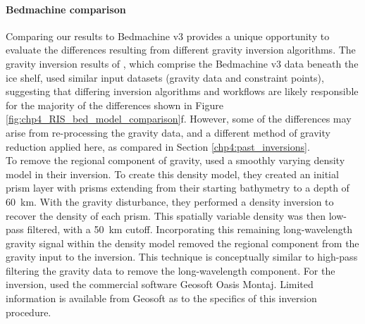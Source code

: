 \paragraph*{Bedmachine comparison}

Comparing our results to Bedmachine v3 provides a unique opportunity to evaluate the differences resulting from different gravity inversion algorithms. The gravity inversion results of \citet{tintoross2019}, which comprise the Bedmachine v3 data beneath the ice shelf, used similar input datasets (gravity data and constraint points), suggesting that differing inversion algorithms and workflows are likely responsible for the majority of the differences shown in Figure \ref{fig:chp4_RIS_bed_model_comparison}f. However, some of the differences may arise from re-processing the gravity data, and a different method of gravity reduction applied here, as compared in Section \ref{chp4:past_inversions}.\\


To remove the regional component of gravity, \citet{tintoross2019} used a smoothly varying density model in their inversion. To create this density model, they created an initial prism layer with prisms extending from their starting bathymetry to a depth of 60~km. With the gravity disturbance, they performed a density inversion to recover the density of each prism. This spatially variable density was then low-pass filtered, with a 50~km cutoff. Incorporating this remaining long-wavelength gravity signal within the density model removed the regional component from the gravity input to the inversion. This technique is conceptually similar to high-pass filtering the gravity data to remove the long-wavelength component. For the inversion, \citet{tintoross2019} used the commercial software Geosoft Oasis Montaj. Limited information is available from Geosoft as to the specifics of this inversion procedure.\\

